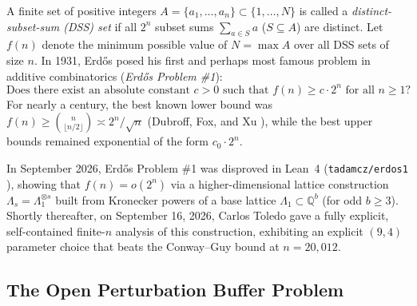 \documentclass[11pt,a4paper]{article}
\theoremstyle{plain}
\theoremstyle{definition}
\newcommand{\Q}{\mathbb{Q}}
\begin{document}
A finite set of positive integers $A = \{a_1, \dots, a_n\} \subset \{1, \dots, N\}$ is called a \emph{distinct-subset-sum (DSS) set} if all $2^n$ subset sums $\sum_{a \in S} a$ ($S \subseteq A$) are distinct. Let $f(n)$ denote the minimum possible value of $N = \max A$ over all DSS sets of size $n$. In 1931, Erd\H{o}s posed his first and perhaps most famous problem in additive combinatorics (\emph{Erd\H{o}s Problem \#1}):
\[
\text{Does there exist an absolute constant } c > 0 \text{ such that } f(n) \ge c \cdot 2^n \text{ for all } n \ge 1\text{?}
\]
For nearly a century, the best known lower bound was $f(n) \ge \binom{n}{\lfloor n/2 \rfloor} \asymp 2^n / \sqrt{n}$ (Dubroff, Fox, and Xu \cite{DFX21}), while the best upper bounds remained exponential of the form $c_0 \cdot 2^n$.

In September 2026, Erd\H{o}s Problem \#1 was disproved in Lean~4 (\texttt{tadamcz/erdos1} \cite{Adamcz26}), showing that $f(n) = o(2^n)$ via a higher-dimensional lattice construction $\Lambda_s = \Lambda_1^{\otimes s}$ built from Kronecker powers of a base lattice $\Lambda_1 \subset \Q^b$ (for odd $b \ge 3$). Shortly thereafter, on September 16, 2026, Carlos Toledo \cite{Toledo26} gave a fully explicit, self-contained finite-$n$ analysis of this construction, exhibiting an explicit $(9,4)$ parameter choice that beats the Conway--Guy bound at $n = 20{,}012$.

\subsection{The Open Perturbation Buffer Problem}
\end{document}
